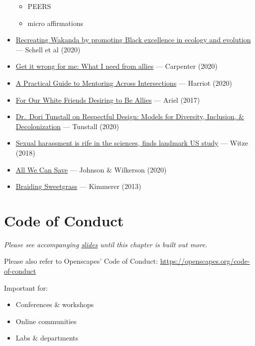 \documentclass[
  letterpaper,
  DIV=11,
  numbers=noendperiod]{scrreprt}
\providecommand{\tightlist}{%
  \setlength{\itemsep}{0pt}\setlength{\parskip}{0pt}}
\begin{document}
\begin{itemize}
  \begin{itemize}
  \tightlist
  \item
    PEERS
  \item
    micro affirmations
  \end{itemize}
\item
  \href{https://www.nature.com/articles/s41559-020-1266-7}{Recreating
  Wakanda by promoting Black excellence in ecology and evolution} ---
  Schell et al (2020)
\item
  \href{www.linkedin.com/pulse/get-wrong-me-what-i-need-from-allies-megan-carpenter}{Get
  it wrong for me: What I need from allies} --- Carpenter (2020)
\item
  \href{https://conversations.vanguardstem.com/a-practical-guide-to-mentoring-across-intersections-c596496ee334}{A
  Practical Guide to Mentoring Across Intersections} --- Harriot (2020)
\item
  \href{https://sojo.net/articles/our-white-friends-desiring-be-allies}{For
  Our White Friends Desiring to Be Allies} --- Ariel (2017)\\
\item
  \href{www.youtube.com/watch?v=oaesVb7O38s}{Dr.~Dori Tunstall on
  Respectful Design: Models for Diversity, Inclusion, \& Decolonization}
  --- Tunstall (2020)
\item
  \href{www.nature.com/articles/d41586-018-05404-6}{Sexual harassment is
  rife in the sciences, finds landmark US study} --- Witze (2018)
\item
  \href{www.allwecansave.earth}{All We Can Save} --- Johnson \&
  Wilkerson (2020)
\item
  \href{https://milkweed.org/book/braiding-sweetgrass}{Braiding
  Sweetgrass} --- Kimmerer (2013)
\end{itemize}

\hypertarget{code-of-conduct}{%
\chapter{Code of Conduct}\label{code-of-conduct}}

\emph{Please see accompanying
\href{https://docs.google.com/presentation/d/1eydm6NcrR_T2NwoMWYBWM682OW-qr755iYemVWL8cJg/edit?usp=sharing}{slides}
until this chapter is built out more.}

Please also refer to Openscapes' Code of Conduct:
\url{https://openscapes.org/code-of-conduct}

Important for:

\begin{itemize}
\tightlist
\item
  Conferences \& workshops\\
\item
  Online communities\\
\item
  Labs \& departments
\end{itemize}
\end{document}
